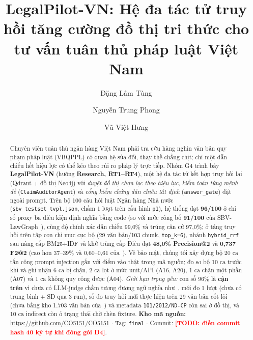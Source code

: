 \documentclass[sigconf,nonacm]{acmart}
\newcommand{\TODO}[1]{\textcolor{red}{\textbf{[TODO: #1]}}}
\begin{document}
\title{LegalPilot-VN: Hệ đa tác tử truy hồi tăng cường đồ thị tri thức cho tư vấn tuân thủ pháp luật Việt Nam}

\author{Đặng Lâm Tùng}

\author{Nguyễn Trung Phong}

\author{Vũ Việt Hưng}

\renewcommand{\shortauthors}{G4: Tùng, Phong, Hưng}

\begin{abstract}
Chuyên viên tuân thủ ngân hàng Việt Nam phải tra cứu hàng nghìn văn bản quy phạm pháp luật (VBQPPL) có quan hệ sửa đổi, thay thế chằng chịt; chỉ một dẫn chiếu hết hiệu lực có thể kéo theo rủi ro pháp lý trực tiếp. Nhóm G4 trình bày \textbf{LegalPilot-VN} (hướng \textbf{Research, RT1--RT4}), một hệ đa tác tử kết hợp truy hồi lai (Qdrant + đồ thị Neo4j) với \emph{duyệt đồ thị chọn lọc theo hiệu lực}, \emph{kiểm toán từng mệnh đề} (\texttt{ClaimAuditorAgent}) và \emph{cổng kiểm chứng dẫn chiếu tất định} (\texttt{answer\_gate}) đặt ngoài prompt. Trên bộ 100 câu hỏi luật Ngân hàng Nhà nước (\texttt{sbv\_testset\_tvpl.json}, chấm 1 lượt trên cấu hình \texttt{p1}), hệ thống đạt \textbf{96/100} ở chỉ số proxy ba điều kiện định nghĩa bằng code (so với mức công bố \textbf{91/100} của SBV-LawGraph~\cite{phan2026sbv}), cùng độ chính xác dẫn chiếu 99,0\% và trúng căn cứ 97,0\%; ở tầng truy hồi trên tập con chỉ mục cục bộ (29 văn bản/103 chunk, \texttt{top\_k=6}), nhánh \texttt{hybrid\_rrf} sau nâng cấp BM25+IDF và khử trùng cấp Điều đạt \textbf{48,0\% Precision@2} và \textbf{0,737 F2@2} (cao hơn 37--39\% và 0,60--0,61 của~\cite{phan2026sbv}). Về bảo mật, chúng tôi xây dựng bộ 20 ca tấn công prompt injection gắn với điểm vào thật trong mã nguồn; đo sơ bộ 10 ca trước khi vá ghi nhận 6 ca bị chặn, 2 ca lọt ở mức unit/API (A16, A20), 1 ca chặn một phần (A07) và 1 ca không quy công được (A04). \emph{Giới hạn trọng yếu:} con số 96\% là \textbf{cận trên} vì chưa có LLM-judge chấm tương đương ngữ nghĩa như~\cite{phan2026sbv}, mới đo 1 lượt (chưa có trung bình $\pm$ SD qua 3 run), số đo truy hồi mới thực hiện trên 29 văn bản cốt lõi (chưa bằng kho 1.703 văn bản của~\cite{phan2026sbv}) và metadata \texttt{101/2012/ND-CP} còn sai ở đồ thị, và 10 ca indirect còn ở trạng thái chờ chèn fixture. \textbf{Kho mã nguồn:} \url{https://github.com/CO5151/CO5151} $\cdot$ Tag: \texttt{final} $\cdot$ Commit: \TODO{điền commit hash 40 ký tự khi đóng gói D4}.
\end{abstract}
\end{document}
